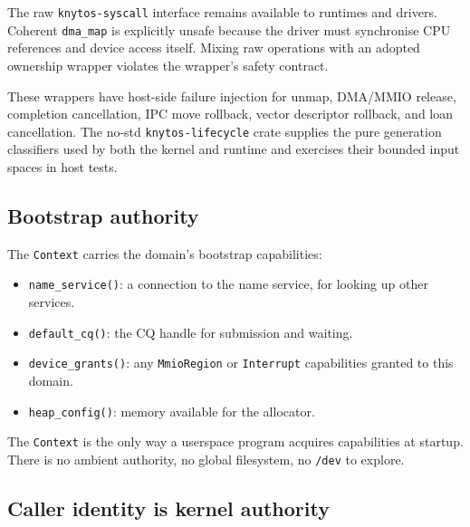 The raw \texttt{knytos-syscall} interface remains available to runtimes and
drivers. Coherent \texttt{dma\_map} is explicitly unsafe because the driver
must synchronise CPU references and device access itself. Mixing raw
operations with an adopted ownership wrapper violates the wrapper's safety
contract.

These wrappers have host-side failure injection for unmap, DMA/MMIO release,
completion cancellation, IPC move rollback, vector descriptor rollback, and
loan cancellation. The no-std \texttt{knytos-lifecycle} crate supplies the
pure generation classifiers used by both the kernel and runtime and exercises
their bounded input spaces in host tests.

\subsection{Bootstrap authority}

The \texttt{Context} carries the domain's bootstrap capabilities:

\begin{itemize}
    \item \texttt{name\_service()}: a connection to the name service, for
        looking up other services.
    \item \texttt{default\_cq()}: the CQ handle for submission and waiting.
    \item \texttt{device\_grants()}: any \texttt{MmioRegion} or
        \texttt{Interrupt} capabilities granted to this domain.
    \item \texttt{heap\_config()}: memory available for the allocator.
\end{itemize}

The \texttt{Context} is the only way a userspace program acquires capabilities
at startup. There is no ambient authority, no global filesystem, no
\texttt{/dev} to explore.

\subsection{Caller identity is kernel authority}

